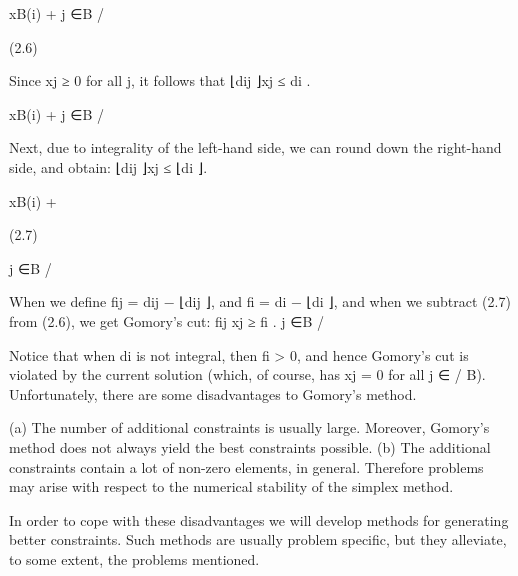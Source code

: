 \documentclass[titlepage]{book}
\theoremstyle{plain}
\theoremstyle{definition}
\theoremstyle{remark}
\begin{document}
xB(i) +
j ∈B
/

(2.6)

Since xj ≥ 0 for all j, it follows that
⌊dij ⌋xj ≤ di .

xB(i) +
j ∈B
/

Next, due to integrality of the left-hand side, we can round down the right-hand side, and obtain:
⌊dij ⌋xj ≤ ⌊di ⌋.

xB(i) +

(2.7)

j ∈B
/

When we define fij = dij − ⌊dij ⌋, and fi = di − ⌊di ⌋, and when we subtract (2.7) from (2.6), we get
Gomory's cut:
fij xj ≥ fi .
j ∈B
/

Notice that when di is not integral, then fi > 0, and hence Gomory's cut is violated by the current
solution (which, of course, has xj = 0 for all j ∈
/ B).
Unfortunately, there are some disadvantages to Gomory's method.

(a) The number of additional constraints is usually large. Moreover, Gomory's method does not always
yield the best constraints possible.
(b) The additional constraints contain a lot of non-zero elements, in general. Therefore problems may
arise with respect to the numerical stability of the simplex method.

In order to cope with these disadvantages we will develop methods for generating better constraints. Such
methods are usually problem specific, but they alleviate, to some extent, the problems mentioned.
\end{document}
